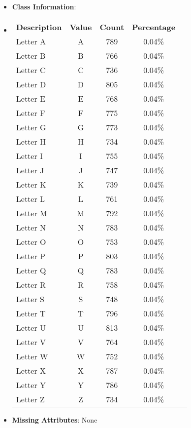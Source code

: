 \documentclass[11pt,titlepage]{article}
\newcommand{\bb}{\textbf}
\begin{document}
\begin{itemize}[leftmargin=*]
  \item[] \bb{Class Information}:
  \item[]
  \begin{tabular}{l c c c c }
    \bb{Description} & \bb{Value} & \bb{Count} & \bb{Percentage} \\
    Letter A                & A          & 789        & 0.04\% \\
    Letter B                & B          & 766        & 0.04\% \\
    Letter C                & C          & 736        & 0.04\% \\
    Letter D                & D          & 805        & 0.04\% \\
    Letter E                & E          & 768        & 0.04\% \\
    Letter F                & F          & 775        & 0.04\% \\
    Letter G                & G          & 773        & 0.04\% \\
    Letter H                & H          & 734        & 0.04\% \\
    Letter I                & I          & 755        & 0.04\% \\
    Letter J                & J          & 747        & 0.04\% \\
    Letter K                & K          & 739        & 0.04\% \\
    Letter L                & L          & 761        & 0.04\% \\
    Letter M                & M          & 792        & 0.04\% \\
    Letter N                & N          & 783        & 0.04\% \\
    Letter O                & O          & 753        & 0.04\% \\
    Letter P                & P          & 803        & 0.04\% \\
    Letter Q                & Q          & 783        & 0.04\% \\
    Letter R                & R          & 758        & 0.04\% \\
    Letter S                & S          & 748        & 0.04\% \\
    Letter T                & T          & 796        & 0.04\% \\
    Letter U                & U          & 813        & 0.04\% \\
    Letter V                & V          & 764        & 0.04\% \\
    Letter W                & W          & 752        & 0.04\% \\
    Letter X                & X          & 787        & 0.04\% \\
    Letter Y                & Y          & 786        & 0.04\% \\
    Letter Z                & Z          & 734        & 0.04\%
  \end{tabular}
  \item[] \bb{Missing Attributes}: None
\end{itemize}
\end{document}
